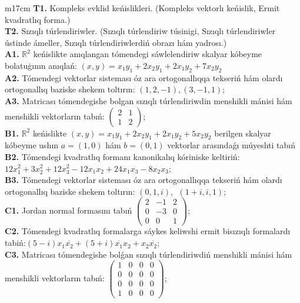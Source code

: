 \documentclass{article}
\begin{document}
\begin{tabular}{m{17cm}}
\textbf{T1.} Kompleks evklid keńislikleri.  (Kompleks vektorlı keńislik, Ermit kvadratlıq forma.) \\
\textbf{T2.} Sızıqlı túrlendiriwler.  (Sızıqlı túrlendiriw túsinigi, Sızıqlı túrlendiriwler ústinde ámeller, Sızıqlı túrlendiriwlerdiń obrazı hám yadrosı.) \\
\textbf{A1.} \(\mathbb{R}^{2}\) keńislikte anıqlangan tómendegi sáwlelendiriw skalyar kóbeyme bolatuģının anıqlań: \((x,y) = x_{1}y_{1} + 2x_{2}y_{1} + 2x_{1}y_{2} + 7x_{2}y_{2}\) \\
\textbf{A2.} Tómendegi vektorlar sisteması óz ara ortogonallıqqa tekseriń hám olardı ortogonallıq baziske shekem toltırın: \((1,2, - 1),(3, - 1,1)\); \\
\textbf{A3.} Matricası tómendegishe bolgan sızıqlı túrlendiriwdin menshikli mánisi hám menshikli vektorların tabıń: \(\begin{pmatrix} 2 & 1 \\ 1 & 2 \end{pmatrix}\); \\
\textbf{B1.} \(\mathbb{R}^{2}\) keńislikte \((x,y) = x_{1}y_{1} + 2x_{2}y_{1} + 2x_{1}y_{2} + 5x_{2}y_{2}\) berilgen skalyar kóbeyme ushın \(a = (1,0)\) hám \(b = (0,1)\) vektorlar arasındaǵı múyeshti tabıń \\
\textbf{B2.} Tómendegi kvadratlıq formanı kanonikalıq kóriniske keltiriń: \(12x_{1}^{2} + 3x_{2}^{2} + 12x_{3}^{2} - 12x_{1}x_{2} + 24x_{1}x_{3} - 8x_{2}x_{3}\); \\
\textbf{B3.} Tómendegi vektorlar sisteması óz ara ortogonallıqqa tekseriń hám olardı ortogonallıq baziske shekem toltırın: \((0,1,i),\ \ (1 + i,i,1)\); \\
\textbf{C1.} Jordan normal formasını tabıń \(\begin{pmatrix} 2 & - 1 & 2 \\ 0 & - 3 & 0 \\ 0 & 0 & 1 \end{pmatrix}\); \\
\textbf{C2.} Tómendegi kvadratlıq formalarga sáykes keliwshi ermit bisızıqlı formalardı tabiń:\((5 - i)x_{1}\overline{x_{2}} + (5 + i)\overline{x_{1}}x_{2} + x_{2}\overline{x_{2}}\); \\
\textbf{C3.} Matricası tómendegishe bolǵan sızıqlı túrlendiriwdiń menshikli mánisi hám menshikli vektorların tabıń: \(\begin{pmatrix} 1 & 0 & 0 & 0 \\ 0 & 0 & 0 & 0 \\ 0 & 0 & 0 & 0 \\ 1 & 0 & 0 & 0 \end{pmatrix}\); \\

\end{tabular}
\vspace{1cm}
\end{document}
